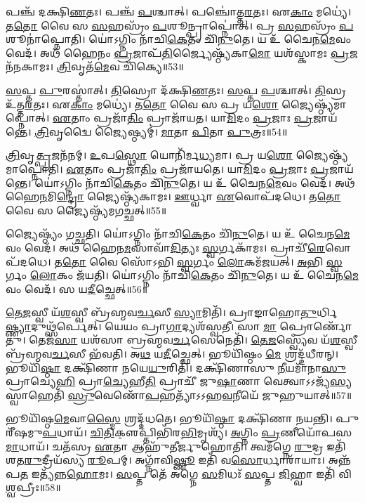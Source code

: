    𑌪𑌞𑍍𑌚᳴ 𑌦𑌕𑍍𑌷𑌿\-\ul{𑌣}\-𑌤𑌃।
   𑌪𑌞𑍍𑌚᳴ \ul{𑌪}\-𑌶𑍍𑌚𑌾𑌤𑍍।
   𑌪𑌞𑍍𑌚𑍋॑𑌤𑍍𑌤\-\ul{𑌰}\-𑌤𑌃।
   𑌏\-\ul{𑌕𑌾𑌂} 𑌮𑌧𑍍𑌯𑍇॑।
   𑌤\-\ul{𑌤𑍋} 𑌵𑍈 𑌸 \ul{𑌸}\-𑌹𑌸𑍍𑌰𑌂᳴ \ul{𑌪}\-𑌶𑍂𑌨𑍍𑌪𑍍𑌰𑌾𑌪𑍍𑌨𑍋॑𑌤𑍍।
   𑌪𑍍𑌰 \ul{𑌸}\-𑌹𑌸𑍍𑌰𑌂᳴ \ul{𑌪}\-𑌶𑍂𑌨𑌾॑𑌪𑍍𑌨𑍋𑌤𑌿।
   𑌯𑍋॑𑌽𑌗𑍍𑌨𑌿𑌂 𑌨𑌾᳴𑌚𑌿\-\ul{𑌕𑍇}\-𑌤𑌂 𑌚𑌿᳴\-\ul{𑌨𑍁}\-𑌤𑍇।
   𑌯 𑌉᳴ 𑌚𑍈𑌨\-\ul{𑌮𑍇}\-𑌵𑌂 𑌵𑍇𑌦᳴।
   𑌅𑌥᳴ 𑌹𑍈𑌨𑌂 \ul{𑌪𑍍𑌰}\-𑌜𑌾𑌪᳴\-\ul{𑌤𑌿}\-𑌰𑍍𑌜𑍍𑌯𑍈𑌷𑍍𑌠𑍍𑌯᳴𑌕𑌾\-\ul{𑌮𑍋} 𑌯𑌶᳴𑌸𑍍𑌕𑌾𑌮𑌃 \ul{𑌪𑍍𑌰}\-𑌜𑌨᳴𑌨𑌕𑌾𑌮𑌃।
   \ul{𑌤𑍍𑌰𑌿}\-𑌵𑍃𑌤᳴\-\ul{𑌮𑍇}\-𑌵 𑌚𑌿᳴𑌕𑍍𑌯𑍇॥53॥

   \ul{𑌸}\-𑌪𑍍𑌤 \ul{𑌪𑍁}\-𑌰𑌸𑍍𑌤𑌾॑𑌤𑍍।
   \ul{𑌤𑌿}\-𑌸𑍍𑌰𑍋 𑌦᳴𑌕𑍍𑌷𑌿\-\ul{𑌣}\-𑌤𑌃।
   \ul{𑌸}\-𑌪𑍍𑌤 \ul{𑌪}\-𑌶𑍍𑌚𑌾𑌤𑍍।
   \ul{𑌤𑌿}\-𑌸𑍍𑌰 𑌉᳴𑌤𑍍𑌤\-\ul{𑌰}\-𑌤𑌃।
   𑌏\-\ul{𑌕𑌾𑌂} 𑌮𑌧𑍍𑌯𑍇॑।
   𑌤\-\ul{𑌤𑍋} 𑌵𑍈 𑌸 𑌪𑍍𑌰 𑌯\-\ul{𑌶𑍋} 𑌜𑍍𑌯𑍈𑌷𑍍𑌠𑍍𑌯᳴𑌮𑌾𑌪𑍍𑌨𑍋𑌤𑍍।
   \ul{𑌏}\-𑌤𑌾𑌂 𑌪𑍍𑌰𑌜𑌾᳴\-\ul{𑌤𑌿𑌂} 𑌪𑍍𑌰𑌾𑌜𑌾᳴𑌯𑌤।
   𑌯𑌾\-\ul{𑌮𑌿}\-𑌦𑌂 \ul{𑌪𑍍𑌰}\-𑌜𑌾𑌃 \ul{𑌪𑍍𑌰}\-𑌜𑌾𑌯᳴𑌨𑍍𑌤𑍇।
   \ul{𑌤𑍍𑌰𑌿}\-𑌵𑍃𑌦𑍍𑌵𑍈 𑌜𑍍𑌯𑍈𑌷𑍍𑌠𑍍𑌯𑌮𑍍॑।
   \ul{𑌮𑌾}\-𑌤𑌾 \ul{𑌪𑌿}\-𑌤𑌾 \ul{𑌪𑍁}\-𑌤𑍍𑌰𑌃॥54॥

   \ul{𑌤𑍍𑌰𑌿}\-𑌵𑍃\-\ul{𑌤𑍍𑌪𑍍𑌰}\-𑌜𑌨᳴𑌨𑌮𑍍।
   \ul{𑌉}\-𑌪\-\ul{𑌸𑍍𑌥𑍋} 𑌯𑍋𑌨𑌿᳴𑌰𑍍𑌮\-\ul{𑌧𑍍𑌯}\-𑌮𑌾।
   𑌪𑍍𑌰 𑌯\-\ul{𑌶𑍋} 𑌜𑍍𑌯𑍈𑌷𑍍𑌠𑍍𑌯᳴𑌮𑌾𑌪𑍍𑌨𑍋𑌤𑌿।
   \ul{𑌏}\-𑌤𑌾𑌂 𑌪𑍍𑌰𑌜𑌾᳴\-\ul{𑌤𑌿𑌂} 𑌪𑍍𑌰𑌜𑌾᳴𑌯𑌤𑍇।
   𑌯𑌾\-\ul{𑌮𑌿}\-𑌦𑌂 \ul{𑌪𑍍𑌰}\-𑌜𑌾𑌃 \ul{𑌪𑍍𑌰}\-𑌜𑌾𑌯᳴𑌨𑍍𑌤𑍇।
   𑌯𑍋॑𑌽𑌗𑍍𑌨𑌿𑌂 𑌨𑌾᳴𑌚𑌿\-\ul{𑌕𑍇}\-𑌤𑌂 𑌚𑌿᳴\-\ul{𑌨𑍁}\-𑌤𑍇।
   𑌯 𑌉᳴ 𑌚𑍈𑌨\-\ul{𑌮𑍇}\-𑌵𑌂 𑌵𑍇𑌦᳴।
   𑌅𑌥᳴ 𑌹𑍈\-\ul{𑌨}\-𑌮𑌿\-\ul{𑌨𑍍𑌦𑍍𑌰𑍋} 𑌜𑍍𑌯𑍈𑌷𑍍𑌠𑍍𑌯᳴𑌕𑌾𑌮𑌃।
   \ul{𑌊}\-𑌰𑍍𑌧𑍍𑌵𑌾 \ul{𑌏}\-𑌵𑍋𑌪᳴𑌦𑌧𑍇।
   𑌤\-\ul{𑌤𑍋} 𑌵𑍈 𑌸 𑌜𑍍𑌯𑍈𑌷𑍍𑌠𑍍𑌯᳴𑌮𑌗𑌚𑍍𑌛𑌤𑍍॥55॥

   𑌜𑍍𑌯𑍈𑌷𑍍𑌠𑍍𑌯𑌂᳴ 𑌗𑌚𑍍𑌛𑌤𑌿।
   𑌯𑍋॑𑌽𑌗𑍍𑌨𑌿𑌂 𑌨𑌾᳴𑌚𑌿\-\ul{𑌕𑍇}\-𑌤𑌂 𑌚𑌿᳴\-\ul{𑌨𑍁}\-𑌤𑍇।
   𑌯 𑌉᳴ 𑌚𑍈𑌨\-\ul{𑌮𑍇}\-𑌵𑌂 𑌵𑍇𑌦᳴।
   𑌅𑌥᳴ 𑌹𑍈𑌨\-\ul{𑌮}\-𑌸𑌾𑌵𑌾᳴\-\ul{𑌦𑌿}\-𑌤𑍍𑌯𑌃 \ul{𑌸𑍍𑌵}\-𑌰𑍍𑌗𑌕𑌾᳴𑌮𑌃।
   𑌪𑍍𑌰𑌾𑌚𑍀᳴\-\ul{𑌰𑍇}\-𑌵𑍋𑌪᳴𑌦𑌧𑍇।
   𑌤\-\ul{𑌤𑍋} 𑌵𑍈 𑌸𑍋᳴𑌽𑌭𑌿 \ul{𑌸𑍍𑌵}\-𑌰𑍍𑌗𑌂 \ul{𑌲𑍋}\-𑌕𑌮᳴𑌜𑌯𑌤𑍍।
   \ul{𑌅}\-𑌭𑌿 \ul{𑌸𑍍𑌵}\-𑌰𑍍𑌗𑌂 \ul{𑌲𑍋}\-𑌕𑌂 𑌜᳴𑌯𑌤𑌿।
   𑌯𑍋॑𑌽𑌗𑍍𑌨𑌿𑌂 𑌨𑌾᳴𑌚𑌿\-\ul{𑌕𑍇}\-𑌤𑌂 𑌚𑌿᳴\-\ul{𑌨𑍁}\-𑌤𑍇।
   𑌯 𑌉᳴ 𑌚𑍈𑌨\-\ul{𑌮𑍇}\-𑌵𑌂 𑌵𑍇𑌦᳴।
   𑌸 𑌯\-\ul{𑌦𑍀}\-𑌚𑍍𑌛𑍇𑌤𑍍॥56॥

   \ul{𑌤𑍇}\-\-\ul{𑌜}\-𑌸𑍍𑌵𑍀 𑌯᳴\-\ul{𑌶}\-𑌸𑍍𑌵𑍀 𑌬𑍍𑌰᳴𑌹𑍍𑌮𑌵\-\ul{𑌰𑍍𑌚}\-𑌸𑍀 \ul{𑌸𑍍𑌯𑌾}\-𑌮𑌿𑌤𑌿᳴।
   𑌪𑍍𑌰𑌾𑌙𑌾𑌹𑍋\-\ul{𑌤𑍁}\-𑌰𑍍𑌧𑌿\-\ul{𑌷𑍍𑌣𑍍𑌯𑌾}\-\-𑌦𑍁𑌥𑍍𑌸᳴𑌰𑍍𑌪𑍇𑌤𑍍।
   𑌯𑍇𑌯𑌂 𑌪𑍍𑌰𑌾\-\ul{𑌗𑌾}\-𑌦𑍍𑌯𑌶᳴𑌸𑍍𑌵𑌤𑍀।
   𑌸𑌾 \ul{𑌮𑌾} 𑌪𑍍𑌰𑍋𑌰𑍍𑌣𑍋᳴𑌤𑍁।
   𑌤𑍇𑌜᳴\-\ul{𑌸𑌾} 𑌯𑌶᳴𑌸𑌾 𑌬𑍍𑌰𑌹𑍍𑌮𑌵\-\ul{𑌰𑍍𑌚}\-𑌸𑍇𑌨𑍇𑌤𑌿᳴।
   \ul{𑌤𑍇}\-\-\ul{𑌜}\-𑌸𑍍𑌵𑍍𑌯𑍇᳴𑌵 𑌯᳴\-\ul{𑌶}\-𑌸𑍍𑌵𑍀 𑌬𑍍𑌰᳴𑌹𑍍𑌮𑌵\-\ul{𑌰𑍍𑌚}\-𑌸𑍀 𑌭᳴𑌵𑌤𑌿।
   𑌅\-\ul{𑌥} 𑌯\-\ul{𑌦𑍀}\-𑌚𑍍𑌛𑍇𑌤𑍍।
   𑌭𑍂𑌯𑌿᳴𑌷𑍍𑌠𑌂 \ul{𑌮𑍇} 𑌶𑍍𑌰𑌦𑍍𑌦᳴𑌧𑍀𑌰𑌨𑍍।
   𑌭𑍂𑌯𑌿᳴\-\ul{𑌷𑍍𑌠𑌾} 𑌦𑌕𑍍𑌷𑌿᳴𑌣𑌾 𑌨𑌯𑍇\-\ul{𑌯𑍁}\-𑌰𑌿𑌤𑌿᳴।
   𑌦𑌕𑍍𑌷𑌿᳴𑌣𑌾𑌸𑍁 \ul{𑌨𑍀}\-𑌯𑌮𑌾᳴𑌨𑌾\-\ul{𑌸𑍁} 𑌪𑍍𑌰𑌾𑌚𑍍𑌯𑍇\-\ul{𑌹𑌿} 𑌪𑍍𑌰𑌾\-\ul{𑌚𑍍𑌯𑍇}\-𑌹𑍀\-\ul{𑌤𑌿} 𑌪𑍍𑌰𑌾𑌚𑍀᳴ 𑌜𑍁\-\ul{𑌷𑌾}\-𑌣𑌾 𑌵𑍇𑌤𑍍𑌵𑌾𑌽𑌽𑌜𑍍𑌯᳴\-\ul{𑌸𑍍𑌯} 𑌸𑍍𑌵𑌾𑌹𑍇𑌤𑌿᳴ \ul{𑌸𑍍𑌰𑍁}\-𑌵𑍇𑌣𑍋᳴\-\ul{𑌪}\-𑌹𑌤𑍍𑌯𑌾᳴𑌽𑌽𑌹\-\ul{𑌵}\-𑌨𑍀𑌯𑍇᳴ 𑌜𑍁𑌹𑍁𑌯𑌾𑌤𑍍॥57॥

   𑌭𑍂𑌯𑌿᳴𑌷𑍍𑌠\-\ul{𑌮𑍇}\-𑌵𑌾\-\ul{𑌸𑍍𑌮𑍈} 𑌶𑍍𑌰𑌦𑍍𑌦᳴𑌧𑌤𑍇।
   𑌭𑍂𑌯𑌿᳴\-\ul{𑌷𑍍𑌠𑌾} 𑌦𑌕𑍍𑌷𑌿᳴𑌣𑌾 𑌨𑌯𑌨𑍍𑌤𑌿।
   𑌪𑍁𑌰𑍀᳴𑌷𑌮𑍁\-\ul{𑌪}\-𑌧𑌾𑌯᳴।
   \ul{𑌚𑌿}\-\-\ul{𑌤𑌿}\-𑌕𑍢॒𑌪𑍍𑌤𑌿𑌭𑌿᳴𑌰\-\ul{𑌭𑌿}\-𑌮𑍃𑌶𑍍𑌯᳴।
   \ul{𑌅}\-𑌗𑍍𑌨𑌿𑌂 \ul{𑌪𑍍𑌰}\-𑌣𑍀𑌯𑍋᳴𑌪\-𑌸\-\ul{𑌮𑌾}\-𑌧𑌾𑌯᳴।
   𑌚𑌤᳴𑌸𑍍𑌰 \ul{𑌏}\-𑌤𑌾 𑌆𑌹𑍁᳴𑌤𑍀𑌰𑍍𑌜𑍁𑌹𑍋𑌤𑌿।
   𑌤𑍍𑌵𑌮᳴𑌗𑍍𑌨𑍇 \ul{𑌰𑍁}\-𑌦𑍍𑌰 𑌇𑌤𑌿᳴ 𑌶𑌤\-\ul{𑌰𑍁}\-𑌦𑍍𑌰𑍀𑌯᳴𑌸𑍍𑌯 \ul{𑌰𑍂}\-𑌪𑌮𑍍।
   𑌅𑌗𑍍𑌨𑌾᳴𑌵𑌿\-\ul{𑌷𑍍𑌣𑍂} 𑌇𑌤𑌿᳴ 𑌵\-\ul{𑌸𑍋}\-𑌰𑍍𑌧𑌾𑌰𑌾᳴𑌯𑌾𑌃।
   𑌅𑌨𑍍𑌨᳴𑌪\-\ul{𑌤} 𑌇𑌤𑍍𑌯᳴𑌨𑍍𑌨\-\ul{𑌹𑍋}\-𑌮𑌃।
   \ul{𑌸}\-𑌪𑍍𑌤 𑌤𑍇᳴ 𑌅𑌗𑍍𑌨𑍇 \ul{𑌸}\-𑌮𑌿𑌧𑌃᳴ \ul{𑌸}\-𑌪𑍍𑌤 \ul{𑌜𑌿}\-𑌹𑍍𑌵𑌾 𑌇𑌤𑌿᳴ 𑌵𑌿\-\ul{𑌶𑍍𑌵}\-𑌪𑍍𑌰𑍀𑌃॥58॥
\anuvakamend
  
